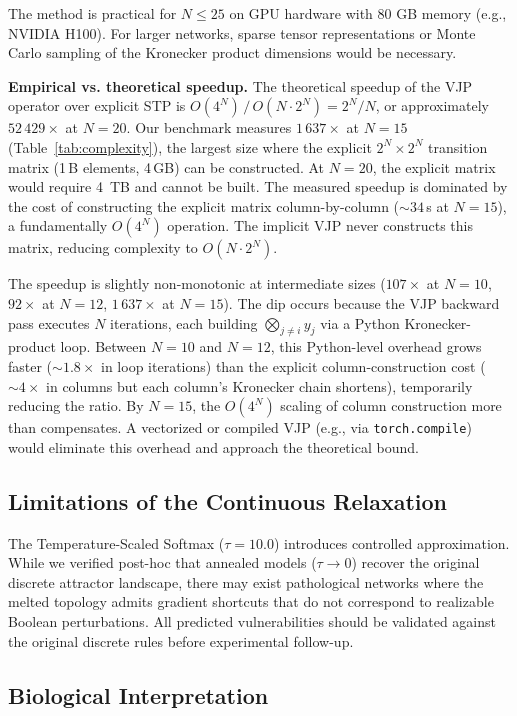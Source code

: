 \documentclass[11pt,a4paper]{article}
\begin{document}
The method is practical for $N \leq 25$ on GPU hardware with 80 GB memory (e.g., NVIDIA H100). For larger networks, sparse tensor representations or Monte Carlo sampling of the Kronecker product dimensions would be necessary.

\textbf{Empirical vs. theoretical speedup.} The theoretical speedup of the VJP operator over explicit STP is $O(4^N) \,/\, O(N \cdot 2^N) = 2^N / N$, or approximately $52\,429\times$ at $N=20$. Our benchmark measures $1\,637\times$ at $N=15$ (Table~\ref{tab:complexity}), the largest size where the explicit $2^N \times 2^N$ transition matrix (1\,B elements, 4\,GB) can be constructed. At $N=20$, the explicit matrix would require 4~TB and cannot be built. The measured speedup is dominated by the cost of constructing the explicit matrix column-by-column ($\sim 34$\,s at $N=15$), a fundamentally $O(4^N)$ operation. The implicit VJP never constructs this matrix, reducing complexity to $O(N \cdot 2^N)$.

The speedup is slightly non-monotonic at intermediate sizes ($107\times$ at $N=10$, $92\times$ at $N=12$, $1\,637\times$ at $N=15$). The dip occurs because the VJP backward pass executes $N$ iterations, each building $\bigotimes_{j\neq i} y_j$ via a Python Kronecker-product loop. Between $N=10$ and $N=12$, this Python-level overhead grows faster ($\sim 1.8\times$ in loop iterations) than the explicit column-construction cost ($\sim 4\times$ in columns but each column's Kronecker chain shortens), temporarily reducing the ratio. By $N=15$, the $O(4^N)$ scaling of column construction more than compensates. A vectorized or compiled VJP (e.g., via \texttt{torch.compile}) would eliminate this overhead and approach the theoretical bound.

\subsection{Limitations of the Continuous Relaxation}
\label{sec:limitations}

The Temperature-Scaled Softmax ($\tau = 10.0$) introduces controlled approximation. While we verified post-hoc that annealed models ($\tau \to 0$) recover the original discrete attractor landscape, there may exist pathological networks where the melted topology admits gradient shortcuts that do not correspond to realizable Boolean perturbations. All predicted vulnerabilities should be validated against the original discrete rules before experimental follow-up.

\subsection{Biological Interpretation}
\label{sec:biological}
\end{document}
